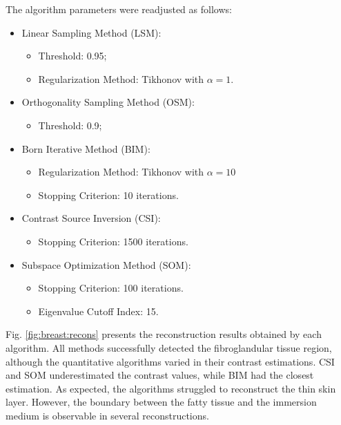 \documentclass{IEEEtran}
\begin{document}
            The algorithm parameters were readjusted as follows:
            \begin{itemize}
                \item Linear Sampling Method (LSM):
                \begin{itemize}
                    \item Threshold: 0.95;
                    \item Regularization Method: Tikhonov with $\alpha = 1$.
                \end{itemize}
                \item Orthogonality Sampling Method (OSM):
                \begin{itemize}
                    \item Threshold: 0.9;
                \end{itemize}
                \item Born Iterative Method (BIM):
                \begin{itemize}
                    \item Regularization Method: Tikhonov with $\alpha = 10$
                    \item Stopping Criterion: 10 iterations.
                \end{itemize}
                \item Contrast Source Inversion (CSI):
                \begin{itemize}
                    \item Stopping Criterion: 1500 iterations.
                \end{itemize}
                \item Subspace Optimization Method (SOM):
                \begin{itemize}
                    \item Stopping Criterion: 100 iterations.
                    \item Eigenvalue Cutoff Index: 15.
                \end{itemize}
            \end{itemize}

            Fig. \ref{fig:breast:recons} presents the reconstruction results obtained by each algorithm. All methods successfully detected the fibroglandular tissue region, although the quantitative algorithms varied in their contrast estimations. CSI and SOM underestimated the contrast values, while BIM had the closest estimation. As expected, the algorithms struggled to reconstruct the thin skin layer. However, the boundary between the fatty tissue and the immersion medium is observable in several reconstructions.
\end{document}
